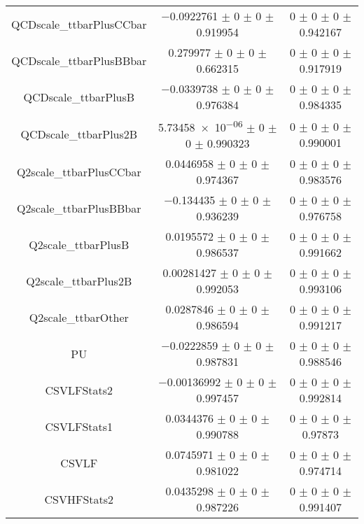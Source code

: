 \begin{table}
\begin{tabular}{ccc}
QCDscale\_ttbarPlusCCbar 	& \num{-0.0922761} $\pm$ \num{0} $\pm$ \num{0} $\pm$ \num{0.919954} 	& \num{0} $\pm$ \num{0} $\pm$ \num{0} $\pm$ \num{0.942167}\\
QCDscale\_ttbarPlusBBbar 	& \num{0.279977} $\pm$ \num{0} $\pm$ \num{0} $\pm$ \num{0.662315} 	& \num{0} $\pm$ \num{0} $\pm$ \num{0} $\pm$ \num{0.917919}\\
QCDscale\_ttbarPlusB 	& \num{-0.0339738} $\pm$ \num{0} $\pm$ \num{0} $\pm$ \num{0.976384} 	& \num{0} $\pm$ \num{0} $\pm$ \num{0} $\pm$ \num{0.984335}\\
QCDscale\_ttbarPlus2B 	& \num{5.73458e-06} $\pm$ \num{0} $\pm$ \num{0} $\pm$ \num{0.990323} 	& \num{0} $\pm$ \num{0} $\pm$ \num{0} $\pm$ \num{0.990001}\\
Q2scale\_ttbarPlusCCbar 	& \num{0.0446958} $\pm$ \num{0} $\pm$ \num{0} $\pm$ \num{0.974367} 	& \num{0} $\pm$ \num{0} $\pm$ \num{0} $\pm$ \num{0.983576}\\
Q2scale\_ttbarPlusBBbar 	& \num{-0.134435} $\pm$ \num{0} $\pm$ \num{0} $\pm$ \num{0.936239} 	& \num{0} $\pm$ \num{0} $\pm$ \num{0} $\pm$ \num{0.976758}\\
Q2scale\_ttbarPlusB 	& \num{0.0195572} $\pm$ \num{0} $\pm$ \num{0} $\pm$ \num{0.986537} 	& \num{0} $\pm$ \num{0} $\pm$ \num{0} $\pm$ \num{0.991662}\\
Q2scale\_ttbarPlus2B 	& \num{0.00281427} $\pm$ \num{0} $\pm$ \num{0} $\pm$ \num{0.992053} 	& \num{0} $\pm$ \num{0} $\pm$ \num{0} $\pm$ \num{0.993106}\\
Q2scale\_ttbarOther 	& \num{0.0287846} $\pm$ \num{0} $\pm$ \num{0} $\pm$ \num{0.986594} 	& \num{0} $\pm$ \num{0} $\pm$ \num{0} $\pm$ \num{0.991217}\\
PU 	& \num{-0.0222859} $\pm$ \num{0} $\pm$ \num{0} $\pm$ \num{0.987831} 	& \num{0} $\pm$ \num{0} $\pm$ \num{0} $\pm$ \num{0.988546}\\
CSVLFStats2 	& \num{-0.00136992} $\pm$ \num{0} $\pm$ \num{0} $\pm$ \num{0.997457} 	& \num{0} $\pm$ \num{0} $\pm$ \num{0} $\pm$ \num{0.992814}\\
CSVLFStats1 	& \num{0.0344376} $\pm$ \num{0} $\pm$ \num{0} $\pm$ \num{0.990788} 	& \num{0} $\pm$ \num{0} $\pm$ \num{0} $\pm$ \num{0.97873}\\
CSVLF 	& \num{0.0745971} $\pm$ \num{0} $\pm$ \num{0} $\pm$ \num{0.981022} 	& \num{0} $\pm$ \num{0} $\pm$ \num{0} $\pm$ \num{0.974714}\\
CSVHFStats2 	& \num{0.0435298} $\pm$ \num{0} $\pm$ \num{0} $\pm$ \num{0.987226} 	& \num{0} $\pm$ \num{0} $\pm$ \num{0} $\pm$ \num{0.991407}\\

\end{tabular}
\end{table}
